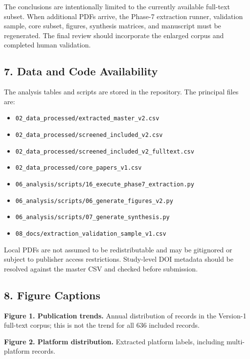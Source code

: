 \documentclass[
  journal]{IEEEtran}
\providecommand{\tightlist}{%
  \setlength{\itemsep}{0pt}\setlength{\parskip}{0pt}}
\begin{document}
The conclusions are intentionally limited to the currently available
full-text subset. When additional PDFs arrive, the Phase-7 extraction
runner, validation sample, core subset, figures, synthesis matrices, and
manuscript must be regenerated. The final review should incorporate the
enlarged corpus and completed human validation.

\subsection{7. Data and Code
Availability}\label{7-data-and-code-availability}

The analysis tables and scripts are stored in the repository. The
principal files are:

\begin{itemize}
\tightlist
\item
  \texttt{02\_data\_processed/extracted\_master\_v2.csv}
\item
  \texttt{02\_data\_processed/screened\_included\_v2.csv}
\item
  \texttt{02\_data\_processed/screened\_included\_v2\_fulltext.csv}
\item
  \texttt{02\_data\_processed/core\_papers\_v1.csv}
\item
  \texttt{06\_analysis/scripts/16\_execute\_phase7\_extraction.py}
\item
  \texttt{06\_analysis/scripts/06\_generate\_figures\_v2.py}
\item
  \texttt{06\_analysis/scripts/07\_generate\_synthesis.py}
\item
  \texttt{08\_docs/extraction\_validation\_sample\_v1.csv}
\end{itemize}

Local PDFs are not assumed to be redistributable and may be gitignored
or subject to publisher access restrictions. Study-level DOI metadata
should be resolved against the master CSV and checked before submission.

\subsection{8. Figure Captions}\label{8-figure-captions}

\textbf{Figure 1. Publication trends.} Annual distribution of records in
the Version-1 full-text corpus; this is not the trend for all 636
included records.

\textbf{Figure 2. Platform distribution.} Extracted platform labels,
including multi-platform records.
\end{document}
